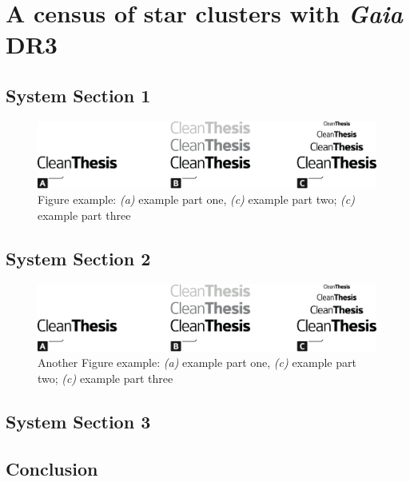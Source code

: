 %
\chapter{A census of star clusters with \emph{Gaia} DR3}
\label{sec:census}


\Blindtext[2][1]

\section{System Section 1}
\label{sec:census:sec1}

\Blindtext[1][2]

\begin{figure}[htb]
	\includegraphics[width=\textwidth]{gfx/Clean-Thesis-Figure}
	\caption{Figure example: \textit{(a)} example part one, \textit{(c)} example part two; \textit{(c)} example part three}
	\label{fig:census:example1}
\end{figure}

\Blindtext[1][2]

\section{System Section 2}
\label{sec:census:sec2}

\Blindtext[1][2]

\begin{figure}[htb]
	\includegraphics[width=\textwidth]{gfx/Clean-Thesis-Figure}
	\caption{Another Figure example: \textit{(a)} example part one, \textit{(c)} example part two; \textit{(c)} example part three}
	\label{fig:census:example2}
\end{figure}

\Blindtext[2][2]

\section{System Section 3}
\label{sec:census:sec3}

\Blindtext[4][2]

\section{Conclusion}
\label{sec:census:conclusion}

\Blindtext[2][1]
